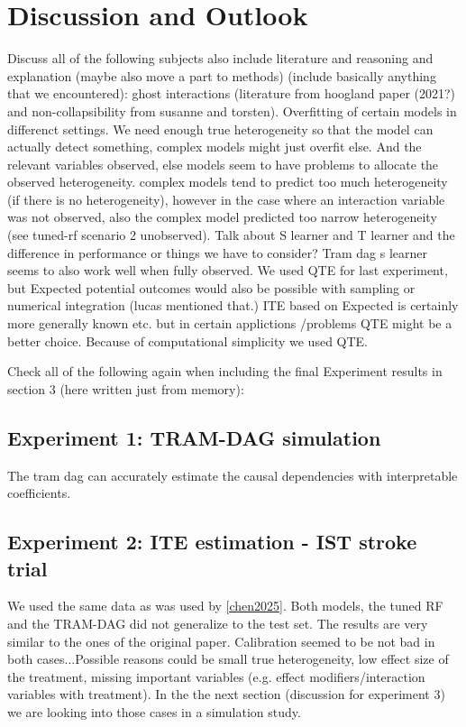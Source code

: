 

\chapter{Discussion and Outlook}


Discuss all of the following subjects also include literature and reasoning and explanation (maybe also move a part to methods) (include basically anything that we encountered): ghost interactions (literature from hoogland paper (2021?) and non-collapsibility from susanne and torsten). Overfitting of certain models in differenct settings. We need enough true heterogeneity so that the model can actually detect something, complex models might just overfit else. And the relevant variables observed, else models seem to have problems to allocate the observed heterogeneity. complex models tend to predict too much heterogeneity (if there is no heterogeneity), however in the case where an interaction variable was not observed, also the complex model predicted too narrow heterogeneity (see tuned-rf scenario 2 unobserved). Talk about S learner and T learner and the difference in performance or things we have to consider? Tram dag s learner seems to also work well when fully observed. We used QTE for last experiment, but Expected potential outcomes would also be possible with sampling or numerical integration (lucas mentioned that.) ITE based on Expected is certainly more generally known etc. but in certain applictions /problems QTE might be a better choice. Because of computational simplicity we used QTE.



Check all of the following again when including the final Experiment results in section 3 (here written just from memory):


\section{Experiment 1: TRAM-DAG simulation}

The tram dag can accurately estimate the causal dependencies with interpretable coefficients.


\section{Experiment 2: ITE estimation - IST stroke trial}

We used the same data as was used by \ref{chen2025}. Both models, the tuned RF and the TRAM-DAG did not generalize to the test set. The results are very similar to the ones of the original paper. Calibration seemed to be not bad in both cases...Possible reasons could be small true heterogeneity, low effect size of the treatment, missing important variables (e.g. effect modifiers/interaction variables with treatment). In the the next section (discussion for experiment 3) we are looking into those cases in a simulation study.




